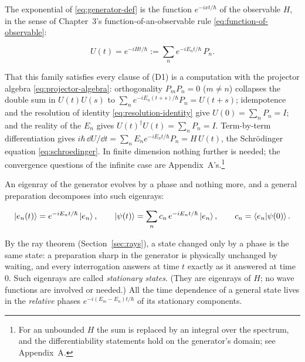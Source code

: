 The exponential of \eqref{eq:generator-def} is the function $e^{-ixt/\hbar}$ of the observable $H$, in the sense of Chapter~3's function-of-an-observable rule \eqref{eq:function-of-observable}:
\begin{linenomath}
    \begin{equation}
        U(t) = e^{-iHt/\hbar} := \sum_n e^{-iE_n t/\hbar}\,P_n .
        \label{eq:evolution-operator}
    \end{equation}
\end{linenomath}
That this family satisfies every clause of (D1) is a computation with the projector algebra \eqref{eq:projector-algebra}: orthogonality $P_m P_n = 0$ ($m \neq n$) collapses the double sum in $U(t)U(s)$ to $\sum_n e^{-iE_n(t+s)/\hbar}P_n = U(t+s)$; idempotence and the resolution of identity \eqref{eq:resolution-identity} give $U(0) = \sum_n P_n = I$; and the reality of the $E_n$ gives $U(t)^\dagger U(t) = \sum_n P_n = I$. Term-by-term differentiation gives $i\hbar\,\dd U/\dd t = \sum_n E_n e^{-iE_n t/\hbar}P_n = H\,U(t)$, the Schr\"odinger equation \eqref{eq:schroedinger}. In finite dimension nothing further is needed; the convergence questions of the infinite case are Appendix~A's.\footnote{For an unbounded $H$ the sum is replaced by an integral over the spectrum, and the differentiability statements hold on the generator's domain; see Appendix~A.}

An eigenray of the generator evolves by a phase and nothing more, and a general preparation decomposes into such eigenrays:
\begin{linenomath}
    \begin{equation}
        \ket{e_n(t)} = e^{-iE_n t/\hbar}\ket{e_n}, \qquad \ket{\psi(t)} = \sum_n c_n\,e^{-iE_n t/\hbar}\ket{e_n}, \qquad c_n = \braket{e_n|\psi(0)} .
        \label{eq:stationary-phase}
    \end{equation}
\end{linenomath}
By the ray theorem (Section~\ref{sec:rays}), a state changed only by a phase is the same state: a preparation sharp in the generator is physically unchanged by waiting, and every interrogation answers at time $t$ exactly as it answered at time $0$. Such eigenrays are called \emph{stationary states}. (They are eigenrays of $H$; no wave functions are involved or needed.) All the time dependence of a general state lives in the \emph{relative} phases $e^{-i(E_m - E_n)t/\hbar}$ of its stationary components.

